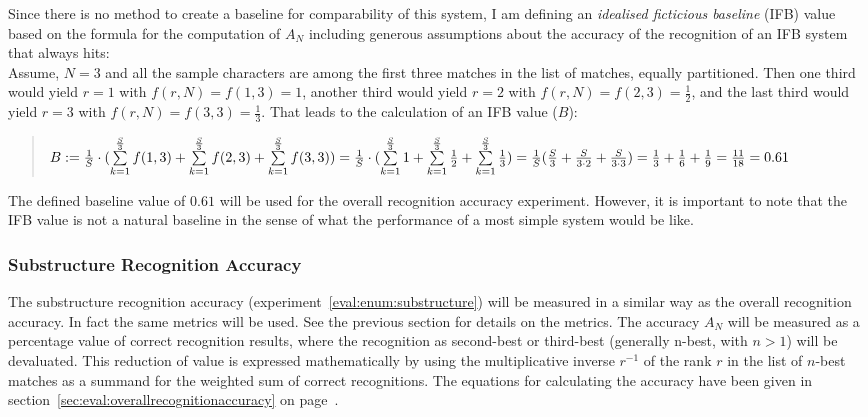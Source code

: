 Since there is no method to create a baseline for comparability of this system,
I am defining an \emph{idealised ficticious baseline} (IFB) value based on 
the formula for the computation of \(A_N\) including generous assumptions 
about the accuracy of the recognition of an IFB system that always hits: \\
Assume, \(N = 3\) and all the sample characters are among the first three 
matches in the list of matches, equally partitioned. 
Then one third would yield \(r = 1\) with \(f(r,N)=f(1,3)=1\),
another third would yield \(r = 2\) with \(f(r,N)=f(2,3)=\frac{1}{2}\),
and the last third would yield \(r = 3\) with \(f(r,N)=f(3,3)=\frac{1}{3}\).
That leads to the calculation of an IFB value (\(B\)):
\begin{quote}
  \(
    B := \frac{1}{S} \cdot (\sum\limits_{k=1}^{\frac{S}{3}}{f(1,3)} + \sum\limits_{k=1}^{\frac{S}{3}}{f(2,3)} + \sum\limits_{k=1}^{\frac{S}{3}}{f(3,3)}) \\
       = \frac{1}{S} \cdot (\sum\limits_{k=1}^{\frac{S}{3}}{1} + \sum\limits_{k=1}^{\frac{S}{3}}{\frac{1}{2}} + \sum\limits_{k=1}^{\frac{S}{3}}{\frac{1}{3}}) \\
       = \frac{1}{S} (\frac{S}{3} + \frac{S}{3 \cdot 2} + \frac{S}{3 \cdot 3}) 
       = \frac{1}{3} + \frac{1}{6} + \frac{1}{9}
       = \frac{11}{18} = 0.61
  \)
\end{quote}
The defined baseline value of \(0.61\) will be used for the overall 
recognition accuracy experiment. However, it is important to note that the 
IFB value is not a natural baseline in the sense of what the performance of a 
most simple system would be like.

\subsubsection{Substructure Recognition Accuracy}
\label{sec:eval:substructurerecognitionaccuracy}

The substructure recognition accuracy (experiment~\ref{eval:enum:substructure})
will be measured in a similar way as the overall recognition accuracy.
In fact the same metrics will be used. See the previous section for details
on the metrics. The accuracy \(A_{N}\) will be measured as a percentage value
of correct recognition results, where the recognition as second-best or 
third-best (generally n-best, with \(n>1\)) will be devaluated. %
This reduction of value is expressed mathematically by using the multiplicative 
inverse \(r^{-1}\) of the rank \(r\) in the list of \(n\)-best 
matches as a summand for the weighted sum of correct recognitions.
The equations for calculating the accuracy have been given in 
section~\ref{sec:eval:overallrecognitionaccuracy}
on page~\pageref{eval:accuracycalculation}.

